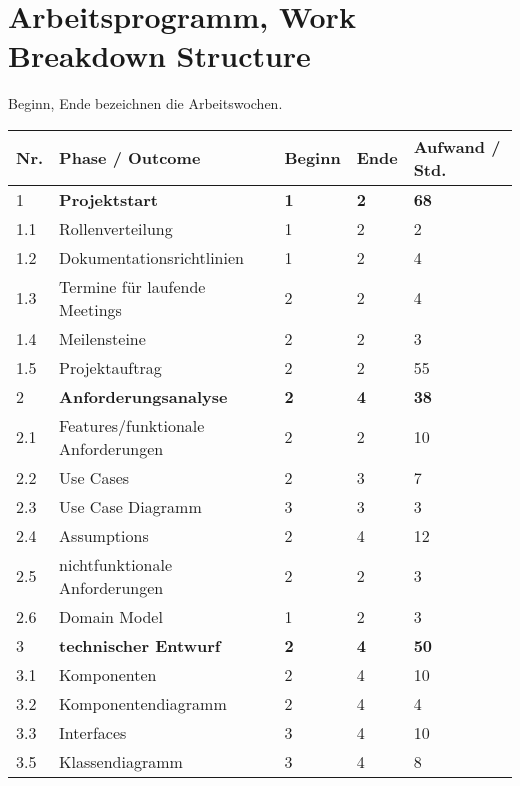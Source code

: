 
\section{Arbeitsprogramm, Work Breakdown Structure}

Beginn, Ende bezeichnen die Arbeitswochen. \\

\begin{tabular}{ | l | p{8cm} | l |l|l|}
\hline
\textbf{Nr.} & \textbf{Phase / Outcome} & \textbf{Beginn}& \textbf{Ende}& \textbf{Aufwand / Std.} \\
\hline
1 & \textbf{Projektstart}                      & \textbf{1} & \textbf{2} & \textbf{68} \\
\hline
1.1& Rollenverteilung                  &1 &2 &2 \\
\hline
1.2 &Dokumentationsrichtlinien         &1 &2 &4 \\
\hline
1.3 &Termine für laufende Meetings     &2 &2 &4 \\
\hline
1.4 &Meilensteine                      &2 &2 &3 \\
\hline
1.5 &Projektauftrag                    &2 &2 &55 \\
\hline
2&\textbf{Anforderungsanalyse}               &\textbf{2} &\textbf{4}&\textbf{38}  \\
\hline
2.1 &Features/funktionale Anforderungen&2 &2 &10 \\
\hline
2.2 &Use Cases                         &2 &3 &7  \\
\hline
2.3 &Use Case Diagramm                 &3 &3 & 3 \\
\hline
2.4 &Assumptions                       &2 &4 & 12 \\
\hline
2.5 &nichtfunktionale Anforderungen    &2 &2 & 3 \\
\hline
2.6 &Domain Model                      &1 &2 & 3 \\
\hline
3&\textbf{technischer Entwurf}              &\textbf{2} &\textbf{4} & \textbf{50}  \\
\hline
3.1 &Komponenten                       &2 &4 & 10 \\
\hline
3.2 &Komponentendiagramm               &2 &4 & 4 \\
\hline
3.3 &Interfaces                        &3 &4 & 10 \\
\hline
3.5 &Klassendiagramm                   &3 &4 & 8 \\

\end{tabular}
